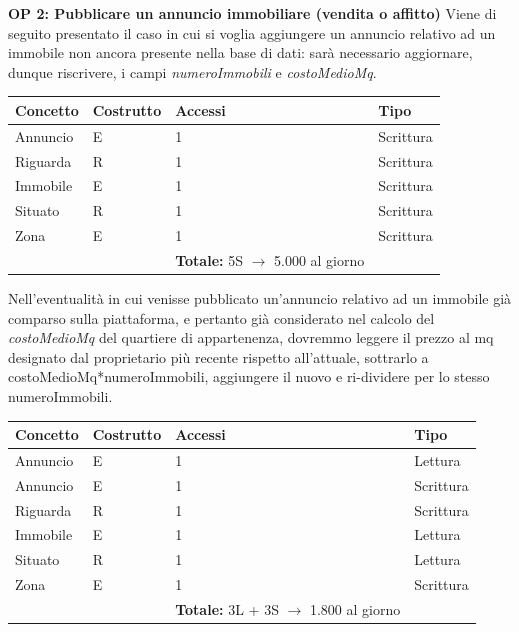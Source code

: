 \documentclass[a4paper,12pt]{report}
\begin{document}
            \textbf{OP 2: Pubblicare un annuncio immobiliare (vendita o affitto)}
            Viene di seguito presentato il caso in cui si voglia aggiungere un annuncio relativo ad un immobile
            non ancora presente nella base di dati: sarà necessario aggiornare, dunque riscrivere, i campi 
            \textit{numeroImmobili} e \textit{costoMedioMq}.
        	\begin{table}[H]
            \centering
             \begin{tabular}{llll}
             \rowcolor{yellow!20} \textbf{Concetto} & \textbf{Costrutto} & \textbf{Accessi} & \textbf{Tipo} \\ [0.5ex] 
             \hline
             Annuncio & E & 1 & Scrittura \\ 
             Riguarda & R & 1 & Scrittura \\ 
             Immobile & E & 1 & Scrittura \\ 
             Situato & R & 1 & Scrittura \\ 
             Zona & E & 1 & Scrittura \\ 
             \hline
             \rowcolor{yellow!20}  \rowcolor{yellow!20} &   & \textbf{Totale:} 5S $\rightarrow$ 5.000 al giorno &  \\ [1ex] 
             \end{tabular}
            \end{table} 
            Nell'eventualità in cui venisse pubblicato un'annuncio relativo ad un immobile già comparso sulla
            piattaforma, e pertanto già considerato nel calcolo del \textit{costoMedioMq} del quartiere di
            appartenenza, dovremmo leggere il prezzo al mq designato dal proprietario più recente rispetto all'attuale, 
            sottrarlo a costoMedioMq*numeroImmobili, aggiungere il nuovo e ri-dividere per lo stesso numeroImmobili.
            
        	\begin{table}[H]
            \centering
             \begin{tabular}{llll}
             \rowcolor{yellow!20}\rowcolor{yellow!20} \textbf{Concetto} & \textbf{Costrutto} & \textbf{Accessi} & \textbf{Tipo}\\ [0.5ex] 
             \hline
             Annuncio & E & 1 & Lettura \\
             Annuncio & E & 1 & Scrittura \\
             Riguarda & R & 1 & Scrittura \\ 
             Immobile & E & 1 & Lettura \\ 
             Situato & R & 1 & Lettura \\ 
             Zona & E & 1 & Scrittura \\  
             \hline
             \rowcolor{yellow!20} &   & \textbf{Totale:} 3L + 3S $\rightarrow$ 1.800 al giorno &  \\ [1ex] 
             \end{tabular}
            \end{table}
\end{document}
